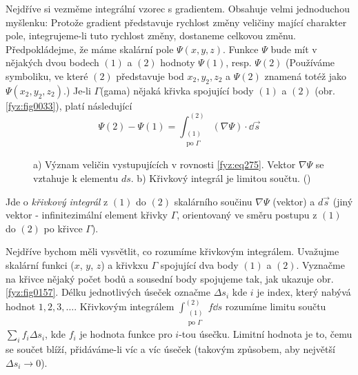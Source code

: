     Nejdříve si vezměme integrální vzorec s gradientem. Obsahuje velmi jednoduchou myšlenku: 
    Protože gradient představuje rychlost změny veličiny mající charakter pole, inte\-gru\-jeme-li 
    tuto rychlost změny, dostaneme celkovou změnu. Předpokládejme, že máme skalární pole \(\Psi(x, 
    y, z)\). Funkce \(\Psi\) bude mít v nějakých dvou bodech \((1)\) a \((2)\) hodnoty \(\Psi(1)\), 
    resp. \(\Psi(2)\) (Používáme symboliku, ve které \((2)\) představuje bod \(x_2, y_2, z_2\) a 
    \(\Psi(2)\) znamená totéž jako \(\Psi(x_2, y_2, z_2)\).) Je-li \(\Gamma\)(gama) nějaká 
    křivka spojující body \((1)\) a \((2)\) (obr. \ref{fyz:fig0033}), platí následující
    \begin{equation}\label{fyz:eq275}
      \Psi(2)-\Psi(1) = \int_{\substack{(1)\\\text{po }\Gamma}}^{(2)}(\nabla\Psi)\cdot\dd{\vec{s}}
    \end{equation} 

    \begin{figure}[ht!] 
      \centering
      \caption{a) Význam veličin vystupujících v rovnosti \ref{fyz:eq275}. Vektor 
      \(\nabla\Psi\) se vztahuje k elementu \(ds\). b) Křivkový integrál je limitou součtu. 	
               (\cite[s.~46]{Feynman02})}
    \end{figure}

    Jde o \emph{křivkový integrál} z \((1)\) do \((2)\) skalárního součinu \(\nabla\Psi\) (vektor) a
    \(d\vec{s}\) (jiný vektor - infinitezimální element křivky \(\Gamma\), orientovaný ve směru  
    postupu z \((1)\) do \((2)\) po křivce \(\Gamma\)).
    
    Nejdříve bychom měli vysvětlit, co rozumíme křivkovým integrálem. Uvažujme skalární funkci 
    (\(x\), \(y\), \(z\)) a křivkxu \(\Gamma\) spojující dva body \((1)\) a \((2)\). Vyznačme na 
    křivce nějaký počet bodů a sousední body spojujeme tak, jak ukazuje obr.  \ref{fyz:fig0157}. 
    Délku jednotlivých úseček označme \(\Delta s_i\) kde \(i\) je index, který nabývá hodnot 
    \(1,2,3,\ldots\). Křivkovým integrálem \(\displaystyle\int_{\substack{(1)\\\text{po 
    }\Gamma}}^{(2)}f\dd{s}\) rozumíme limitu součtu \(\displaystyle\sum_i f_i\Delta s_i\), kde 
    \(f_i\) je hodnota funkce pro \(i\)-tou úsečku. Limitní hodnota je to, čemu se součet blíží, 
    přidáváme-li víc a víc úseček (takovým způsobem, aby největší \(\Delta s_i\rightarrow 0\)).
    
